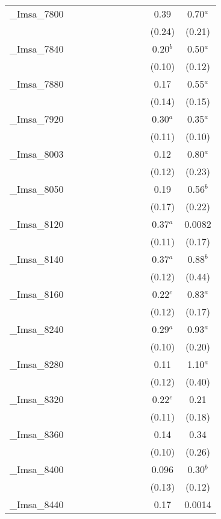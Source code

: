 \documentclass[]{article}
\begin{document}
\begin{tabular}{lcccccccccc}
\_Imsa\_7800 &  &  &  &  &  &  &  &  & 0.39 & 0.70$^a$ \\
 &  &  &  &  &  &  &  &  & (0.24) & (0.21) \\
\_Imsa\_7840 &  &  &  &  &  &  &  &  & 0.20$^b$ & 0.50$^a$ \\
 &  &  &  &  &  &  &  &  & (0.10) & (0.12) \\
\_Imsa\_7880 &  &  &  &  &  &  &  &  & 0.17 & 0.55$^a$ \\
 &  &  &  &  &  &  &  &  & (0.14) & (0.15) \\
\_Imsa\_7920 &  &  &  &  &  &  &  &  & 0.30$^a$ & 0.35$^a$ \\
 &  &  &  &  &  &  &  &  & (0.11) & (0.10) \\
\_Imsa\_8003 &  &  &  &  &  &  &  &  & 0.12 & 0.80$^a$ \\
 &  &  &  &  &  &  &  &  & (0.12) & (0.23) \\
\_Imsa\_8050 &  &  &  &  &  &  &  &  & 0.19 & 0.56$^b$ \\
 &  &  &  &  &  &  &  &  & (0.17) & (0.22) \\
\_Imsa\_8120 &  &  &  &  &  &  &  &  & 0.37$^a$ & 0.0082 \\
 &  &  &  &  &  &  &  &  & (0.11) & (0.17) \\
\_Imsa\_8140 &  &  &  &  &  &  &  &  & 0.37$^a$ & 0.88$^b$ \\
 &  &  &  &  &  &  &  &  & (0.12) & (0.44) \\
\_Imsa\_8160 &  &  &  &  &  &  &  &  & 0.22$^c$ & 0.83$^a$ \\
 &  &  &  &  &  &  &  &  & (0.12) & (0.17) \\
\_Imsa\_8240 &  &  &  &  &  &  &  &  & 0.29$^a$ & 0.93$^a$ \\
 &  &  &  &  &  &  &  &  & (0.10) & (0.20) \\
\_Imsa\_8280 &  &  &  &  &  &  &  &  & 0.11 & 1.10$^a$ \\
 &  &  &  &  &  &  &  &  & (0.12) & (0.40) \\
\_Imsa\_8320 &  &  &  &  &  &  &  &  & 0.22$^c$ & 0.21 \\
 &  &  &  &  &  &  &  &  & (0.11) & (0.18) \\
\_Imsa\_8360 &  &  &  &  &  &  &  &  & 0.14 & 0.34 \\
 &  &  &  &  &  &  &  &  & (0.10) & (0.26) \\
\_Imsa\_8400 &  &  &  &  &  &  &  &  & 0.096 & 0.30$^b$ \\
 &  &  &  &  &  &  &  &  & (0.13) & (0.12) \\
\_Imsa\_8440 &  &  &  &  &  &  &  &  & 0.17 & 0.0014 \\

\end{tabular}
\end{document}
